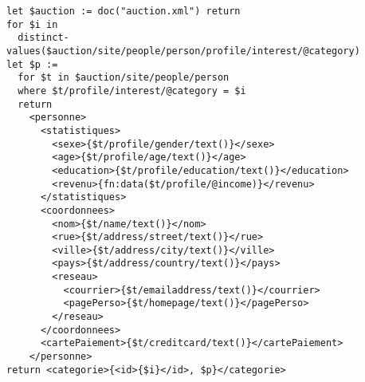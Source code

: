 \begin{lstlisting}[language=XQuery, caption=XPath quantified expression, label=xpath_quant]
let $auction := doc("auction.xml") return
for $i in
  distinct-values($auction/site/people/person/profile/interest/@category)
let $p :=
  for $t in $auction/site/people/person
  where $t/profile/interest/@category = $i
  return
    <personne>
      <statistiques>
        <sexe>{$t/profile/gender/text()}</sexe>
        <age>{$t/profile/age/text()}</age>
        <education>{$t/profile/education/text()}</education>
        <revenu>{fn:data($t/profile/@income)}</revenu>
      </statistiques>
      <coordonnees>
        <nom>{$t/name/text()}</nom>
        <rue>{$t/address/street/text()}</rue>
        <ville>{$t/address/city/text()}</ville>
        <pays>{$t/address/country/text()}</pays>
        <reseau>
          <courrier>{$t/emailaddress/text()}</courrier>
          <pagePerso>{$t/homepage/text()}</pagePerso>
        </reseau>
      </coordonnees>
      <cartePaiement>{$t/creditcard/text()}</cartePaiement>
    </personne>
return <categorie>{<id>{$i}</id>, $p}</categorie>

\end{lstlisting} 
